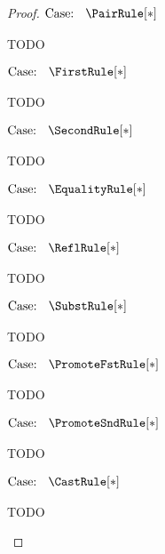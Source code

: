 \begin{proof}
    $\text{Case: }\begin{array}{c} \PairRule[*] \end{array}$
    \begin{proofcase}
        TODO
    \end{proofcase}

    $\text{Case: }\begin{array}{c} \FirstRule[*] \end{array}$
    \begin{proofcase}
        TODO
    \end{proofcase}

    $\text{Case: }\begin{array}{c} \SecondRule[*] \end{array}$
    \begin{proofcase}
        TODO
    \end{proofcase}

    $\text{Case: }\begin{array}{c} \EqualityRule[*] \end{array}$
    \begin{proofcase}
        TODO
    \end{proofcase}

    $\text{Case: }\begin{array}{c} \ReflRule[*] \end{array}$
    \begin{proofcase}
        TODO
    \end{proofcase}

    $\text{Case: }\begin{array}{c} \SubstRule[*] \end{array}$
    \begin{proofcase}
        TODO
    \end{proofcase}

    $\text{Case: }\begin{array}{c} \PromoteFstRule[*] \end{array}$
    \begin{proofcase}
        TODO
    \end{proofcase}

    $\text{Case: }\begin{array}{c} \PromoteSndRule[*] \end{array}$
    \begin{proofcase}
        TODO
    \end{proofcase}

    $\text{Case: }\begin{array}{c} \CastRule[*] \end{array}$
    \begin{proofcase}
        TODO
    \end{proofcase}


\end{proof}
